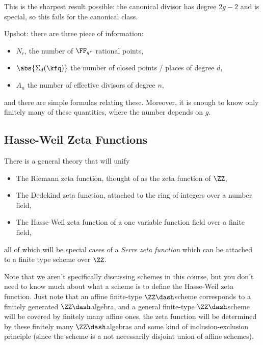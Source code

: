 \begin{remark}

This is the sharpest result possible: the canonical divisor has degree
\(2g-2\) and is special, so this fails for the canonical class.

\end{remark}

Upshot: there are three piece of information:

\begin{itemize}
\item
  \(N_r\), the number of \(\FF_{q^r}\) rational points,
\item
  \(\abs{\Sigma_d(\kfq)}\) the number of closed points / places of
  degree \(d\),
\item
  \(A_n\) the number of effective divisors of degree \(n\),
\end{itemize}

and there are simple formulas relating these. Moreover, it is enough to
know only finitely many of these quantities, where the number depends on
\(g\).

\hypertarget{hasse-weil-zeta-functions}{%
\subsection{Hasse-Weil Zeta Functions}\label{hasse-weil-zeta-functions}}

There is a general theory that will unify

\begin{itemize}
\item
  The Riemann zeta function, thought of as the zeta function of \(\ZZ\),
\item
  The Dedekind zeta function, attached to the ring of integers over a
  number field,
\item
  The Hasse-Weil zeta function of a one variable function field over a
  finite field,
\end{itemize}

all of which will be special cases of a \emph{Serre zeta function} which
can be attached to a finite type scheme over \(\ZZ\).

Note that we aren't specifically discussing schemes in this course, but
you don't need to know much about what a scheme is to define the
Hasse-Weil zeta function. Just note that an affine finite-type
\(\ZZ\dash\)scheme corresponds to a finitely generated
\(\ZZ\dash\)algebra, and a general finite-type \(\ZZ\dash\)scheme will
be covered by finitely many affine ones, the zeta function will be
determined by these finitely many \(\ZZ\dash\)algebras and some kind of
inclusion-exclusion principle (since the scheme is a not necessarily
disjoint union of affine schemes).

